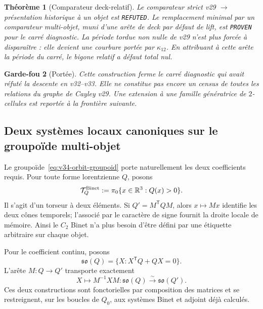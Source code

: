 \documentclass[11pt,a4paper]{article}
\newtheorem{theorem}{Théorème}[section]
\newtheorem{guardrail}[theorem]{Garde-fou}
\newcommand{\certProven}{\texttt{PROVEN}}
\newcommand{\certRefuted}{\texttt{REFUTED}}
\begin{document}
\begin{theorem}[Comparateur deck-relatif]\label{thm:v34-deck-comparator}
Le comparateur strict v29 $\to$ présentation historique à un objet est
\certRefuted{}. Le remplacement minimal par un comparateur multi-objet, muni d'une arête de deck
par défaut de lift, est \certProven{} pour le carré diagnostic. La période tordue non nulle de v29
n'est plus forcée à disparaître : elle devient une courbure portée par $\kappa_{12}$. En attribuant
à cette arête la période du carré, le bigone relatif a défaut total nul.
\end{theorem}

\begin{guardrail}[Portée]
Cette construction ferme le carré diagnostic qui avait réfuté la descente en v32--v33. Elle ne
constitue pas encore un census de toutes les relations du graphe de Cayley v29. Une extension à une
famille génératrice de $2$-cellules est reportée à la frontière suivante.
\end{guardrail}

\subsection{Deux systèmes locaux canoniques sur le groupoïde multi-objet}

Le groupoïde~\eqref{eq:v34-orbit-groupoid} porte naturellement les deux coefficients requis.
Pour toute forme lorentzienne $Q$, posons
\begin{equation}\label{eq:v34-binet-torsor}
 \mathcal T_Q^{\rm Binet}:=\pi_0\{x\in\mathbb R^3:Q(x)>0\}.
\end{equation}
Il s'agit d'un torseur à deux éléments. Si $Q'=M^{\mathsf T}QM$, alors $x\mapsto Mx$ identifie
les deux cônes temporels; l'associé par le caractère de signe fournit la droite locale de mémoire.
Ainsi le $C_2$ Binet n'a plus besoin d'être défini par une étiquette arbitraire sur chaque objet.

Pour le coefficient continu, posons
\begin{equation}\label{eq:v34-soQ-fibre}
 \mathfrak{so}(Q)=\{X:X^{\mathsf T}Q+QX=0\}.
\end{equation}
L'arête $M:Q\to Q'$ transporte exactement
\begin{equation}\label{eq:v34-Ad-groupoid}
 \boxed{
 X\longmapsto M^{-1}XM:
 \mathfrak{so}(Q)\overset\sim\longrightarrow\mathfrak{so}(Q').}
\end{equation}
Ces deux constructions sont fonctorielles par composition des matrices et se restreignent, sur les
boucles de $Q_0$, aux systèmes Binet et adjoint déjà calculés.
\end{document}
